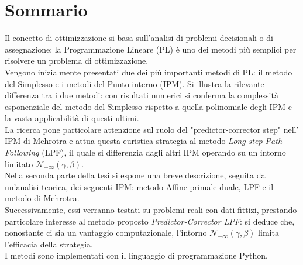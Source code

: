 \documentclass[a4paper,10 pt,titlepage,twoside]{book}
\theoremstyle{plain}
\theoremstyle{definition}
\theoremstyle{remark}
\begin{document}
\chapter*{Sommario}
Il concetto di ottimizzazione si basa sull'analisi di problemi decisionali o di assegnazione: la Programmazione Lineare (PL) è uno dei metodi più semplici per risolvere un problema di ottimizzazione.\\ 
Vengono inizialmente presentati due dei più importanti metodi di PL: il metodo del Simplesso e i metodi del Punto interno (IPM). Si illustra la rilevante differenza tra i due metodi: con risultati numerici si conferma la complessità esponenziale del metodo del Simplesso rispetto a quella polinomiale degli IPM e la vasta applicabilità di questi ultimi.\\
La ricerca pone particolare attenzione sul ruolo del "predictor-corrector step" nell' IPM di Mehrotra e attua questa euristica strategia al metodo \textit{Long-step Path-Following} (LPF), il quale si differenzia dagli altri  IPM operando su un intorno limitato $\mathcal{N}_{-\infty}(\gamma,\beta)$.\\
Nella seconda parte della tesi si espone una breve descrizione, seguita da un'analisi teorica, dei seguenti IPM: metodo Affine primale-duale, LPF e il metodo di Mehrotra.\\
Successivamente, essi verranno testati su problemi reali con dati fittizi, prestando particolare interesse al metodo proposto \textit{Predictor-Corrector LPF}: si deduce che, nonostante ci sia un vantaggio computazionale, l'intorno $\mathcal{N}_{-\infty}(\gamma,\beta)$ limita l'efficacia della strategia.\\   
I metodi sono implementati con il linguaggio di programmazione Python. 
\end{document}
